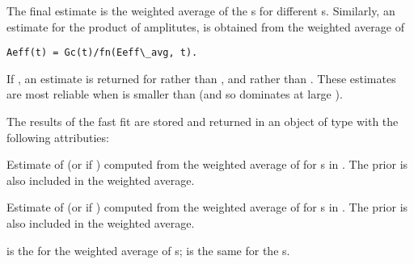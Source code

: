 \documentclass[letterpaper,10pt,english]{sphinxmanual}
\begin{document}
\begin{fulllineitems}
The final estimate is the weighted average  of the
s for different s. Similarly, an estimate for the
product of amplitutes,  is obtained from the weighted
average of

\begin{Verbatim}[commandchars=\\\{\}]
Aeff(t) = Gc(t)/fn(Eeff\_avg, t).
\end{Verbatim}

If , an estimate is returned for  rather
than , and  rather than . 
These estimates are most reliable when  is smaller than
 (and so dominates at large ).

The results of the fast fit are stored and returned in an object of type 
{\hyperref[corrfitter:corrfitter.fastfit]{}} with the following attributies:

\begin{fulllineitems}
\label{corrfitter:fastfit.E}
Estimate of  (or  if ) computed
from the weighted average of  for s in
. The prior is also included in the weighted average.

\end{fulllineitems}


\begin{fulllineitems}
\label{corrfitter:fastfit.ampl}
Estimate of  (or  if )
computed from the weighted average of  for s in
. The prior is also included in the weighted 
average.

\end{fulllineitems}


\begin{fulllineitems}
\label{corrfitter:fastfit.chi2}
 is the  for the weighted average of
s;  is the same for the s.

\end{fulllineitems}


\end{fulllineitems}
\end{document}
